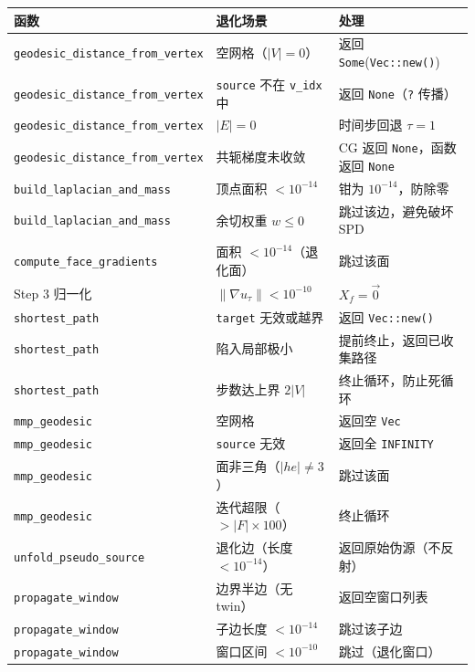\documentclass[11pt,a4paper]{article}
\begin{document}
\begin{center}
\renewcommand{\arraystretch}{1.18}
\begin{tabular}{@{}lp{4.0cm}p{5.4cm}@{}}
  \toprule
  \textbf{函数} & \textbf{退化场景} & \textbf{处理} \\
  \midrule
  \texttt{geodesic\_distance\_from\_vertex}
    & 空网格（$|V| = 0$） & 返回 \texttt{Some}(\texttt{Vec::new()}) \\
  \texttt{geodesic\_distance\_from\_vertex}
    & \texttt{source} 不在 \texttt{v\_idx} 中 & 返回 \texttt{None}（\texttt{?} 传播） \\
  \texttt{geodesic\_distance\_from\_vertex}
    & $|E| = 0$ & 时间步回退 $\tau = 1$ \\
  \texttt{geodesic\_distance\_from\_vertex}
    & 共轭梯度未收敛 & CG 返回 \texttt{None}，函数返回 \texttt{None} \\
  \texttt{build\_laplacian\_and\_mass}
    & 顶点面积 $< 10^{-14}$ & 钳为 $10^{-14}$，防除零 \\
  \texttt{build\_laplacian\_and\_mass}
    & 余切权重 $w \le 0$ & 跳过该边，避免破坏 SPD \\
  \texttt{compute\_face\_gradients}
    & 面积 $< 10^{-14}$（退化面） & 跳过该面 \\
  Step 3 归一化
    & $\|\nabla u_\tau\| < 10^{-10}$ & $X_f = \vec{0}$ \\
  \texttt{shortest\_path}
    & \texttt{target} 无效或越界 & 返回 \texttt{Vec::new()} \\
  \texttt{shortest\_path}
    & 陷入局部极小 & 提前终止，返回已收集路径 \\
  \texttt{shortest\_path}
    & 步数达上界 $2|V|$ & 终止循环，防止死循环 \\
  \midrule
  \texttt{mmp\_geodesic}
    & 空网格 & 返回空 \texttt{Vec} \\
  \texttt{mmp\_geodesic}
    & \texttt{source} 无效 & 返回全 \texttt{INFINITY} \\
  \texttt{mmp\_geodesic}
    & 面非三角（$|he| \ne 3$） & 跳过该面 \\
  \texttt{mmp\_geodesic}
    & 迭代超限（$> |F| \times 100$） & 终止循环 \\
  \texttt{unfold\_pseudo\_source}
    & 退化边（长度 $< 10^{-14}$） & 返回原始伪源（不反射） \\
  \texttt{propagate\_window}
    & 边界半边（无 twin） & 返回空窗口列表 \\
  \texttt{propagate\_window}
    & 子边长度 $< 10^{-14}$ & 跳过该子边 \\
  \texttt{propagate\_window}
    & 窗口区间 $< 10^{-10}$ & 跳过（退化窗口） \\
  \bottomrule
\end{tabular}
\end{center}
\end{document}
